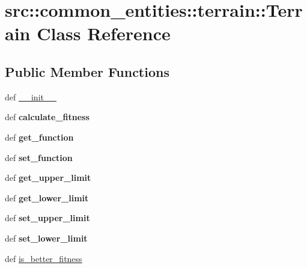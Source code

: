 \hypertarget{classsrc_1_1common__entities_1_1terrain_1_1Terrain}{
\section{src::common\_\-entities::terrain::Terrain Class Reference}
\label{classsrc_1_1common__entities_1_1terrain_1_1Terrain}
}
\subsection*{Public Member Functions}
\begin{DoxyCompactItemize}
\item 
def \hyperlink{classsrc_1_1common__entities_1_1terrain_1_1Terrain_a65ef1024c77b1bb8e3f5d164a3cb7233}{\_\-\_\-init\_\-\_\-}
\item 
\hypertarget{classsrc_1_1common__entities_1_1terrain_1_1Terrain_a5afd912496748cd00d790ef577cc6f56}{
def {\bfseries calculate\_\-fitness}}
\label{classsrc_1_1common__entities_1_1terrain_1_1Terrain_a5afd912496748cd00d790ef577cc6f56}

\item 
\hypertarget{classsrc_1_1common__entities_1_1terrain_1_1Terrain_aaa9fc499fcdafd8ffc0ef10b388adb73}{
def {\bfseries get\_\-function}}
\label{classsrc_1_1common__entities_1_1terrain_1_1Terrain_aaa9fc499fcdafd8ffc0ef10b388adb73}

\item 
\hypertarget{classsrc_1_1common__entities_1_1terrain_1_1Terrain_a9c6b34375935a498ebbe04ef90f9e25c}{
def {\bfseries set\_\-function}}
\label{classsrc_1_1common__entities_1_1terrain_1_1Terrain_a9c6b34375935a498ebbe04ef90f9e25c}

\item 
\hypertarget{classsrc_1_1common__entities_1_1terrain_1_1Terrain_a942087e4e6930b189172172790a2d2af}{
def {\bfseries get\_\-upper\_\-limit}}
\label{classsrc_1_1common__entities_1_1terrain_1_1Terrain_a942087e4e6930b189172172790a2d2af}

\item 
\hypertarget{classsrc_1_1common__entities_1_1terrain_1_1Terrain_a4746c5022e4ae0a792e4fa68bce9845c}{
def {\bfseries get\_\-lower\_\-limit}}
\label{classsrc_1_1common__entities_1_1terrain_1_1Terrain_a4746c5022e4ae0a792e4fa68bce9845c}

\item 
\hypertarget{classsrc_1_1common__entities_1_1terrain_1_1Terrain_a624c6ddc62c760289e815699c8621a36}{
def {\bfseries set\_\-upper\_\-limit}}
\label{classsrc_1_1common__entities_1_1terrain_1_1Terrain_a624c6ddc62c760289e815699c8621a36}

\item 
\hypertarget{classsrc_1_1common__entities_1_1terrain_1_1Terrain_a3f9f494e7651fc9063299dc7277db191}{
def {\bfseries set\_\-lower\_\-limit}}
\label{classsrc_1_1common__entities_1_1terrain_1_1Terrain_a3f9f494e7651fc9063299dc7277db191}

\item 
def \hyperlink{classsrc_1_1common__entities_1_1terrain_1_1Terrain_a8002cbb6ca4a70d55e05968a2dbfd595}{is\_\-better\_\-fitness}
\end{DoxyCompactItemize}
